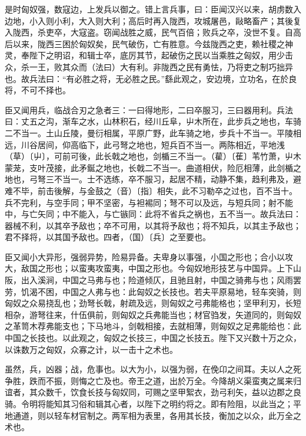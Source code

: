 \documentclass[UTF8,titlepage,oneside]{ctexbook}
\begin{document}
是时匈奴强，数寇边，上发兵以御之。错上言兵事，曰：臣闻汉兴以来，胡虏数入边地，小入则小利，大入则大利；高后时再入陇西，攻城屠邑，敺略畜产；其後复入陇西，杀吏卒，大寇盗。窃闻战胜之威，民气百倍；败兵之卒，没世不复。自高后以来，陇西三困於匈奴矣，民气破伤，亡有胜意。今兹陇西之吏，赖社稷之神灵，奉陛下之明诏，和辑士卒，底厉其节，起破伤之民以当乘胜之匈奴，用少击众，杀一王，败其众而（法曰）大有利。非陇西之民有勇怯，乃将吏之制巧拙异也。故兵法曰：“有必胜之将，无必胜之民。”繇此观之，安边境，立功名，在於良将，不可不择也。

臣又闻用兵，临战合刃之急者三：一曰得地形，二曰卒服习，三曰器用利。兵法曰：丈五之沟，渐车之水，山林积石，经川丘阜，屮木所在，此步兵之地也，车骑二不当一。土山丘陵，曼衍相属，平原广野，此车骑之地，步兵十不当一。平陵相远，川谷居间，仰高临下，此弓弩之地也，短兵百不当一。两陈相近，平地浅（草）〔屮〕，可前可後，此长戟之地也，剑楯三不当一。（雚）〔萑〕苇竹萧，屮木蒙茏，支叶茂接，此矛鋋之地也，长戟二不当一。曲道相伏，险厄相薄，此剑楯之地也，弓弩三不当一。士不选练，卒不服习，起居不精，动静不集，趋利弗及，避难不毕，前击後解，与金鼓之（音）〔指〕相失，此不习勒卒之过也，百不当十。兵不完利，与空手同；甲不坚密，与袒裼同；弩不可以及远，与短兵同；射不能中，与亡矢同；中不能入，与亡镞同：此将不省兵之祸也，五不当一。故兵法曰：器械不利，以其卒予敌也；卒不可用，以其将予敌也；将不知兵，以其主予敌也；君不择将，以其国予敌也。四者，（国）〔兵〕之至要也。

臣又闻小大异形，强弱异势，险易异备。夫卑身以事强，小国之形也；合小以攻大，敌国之形也；以蛮夷攻蛮夷，中国之形也。今匈奴地形技艺与中国异。上下山阪，出入溪涧，中国之马弗与也；险道倾仄，且驰且射，中国之骑弗与也；风雨罢劳，饥渴不困，中国之人弗与也：此匈奴之长技也。若夫平原易地，轻车突骑，则匈奴之众易挠乱也；劲弩长戟，射疏及远，则匈奴之弓弗能格也；坚甲利刃，长短相杂，游弩往来，什伍俱前，则匈奴之兵弗能当也；材官驺发，矢道同的，则匈奴之革笥木荐弗能支也；下马地斗，剑戟相接，去就相薄，则匈奴之足弗能给也：此中国之长技也。以此观之，匈奴之长技三，中国之长技五。陛下又兴数十万之众，以诛数万之匈奴，众寡之计，以一击十之术也。

虽然，兵，凶器；战，危事也。以大为小，以强为弱，在俛卬之间耳。夫以人之死争胜，跌而不振，则悔之亡及也。帝王之道，出於万全。今降胡义渠蛮夷之属来归谊者，其众数千，饮食长技与匈奴同，可赐之坚甲絮衣，劲弓利矢，益以边郡之良骑。令明将能知其习俗和辑其心者，以陛下之明约将之。即有险阻，以此当之；平地通道，则以轻车材官制之。两军相为表里，各用其长技，衡加之以众，此万全之术也。
\end{document}
